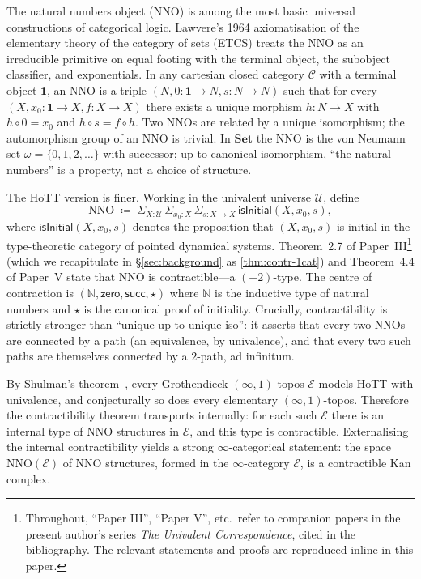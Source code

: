 \documentclass[12pt]{article}
\theoremstyle{definition}
\theoremstyle{remark}
\newcommand{\N}{\mathbb{N}}
\newcommand{\Set}{\mathbf{Set}}
\newcommand{\zero}{\mathsf{zero}}
\newcommand{\suc}{\mathsf{succ}}
\newcommand{\NNO}{\mathrm{NNO}}
\newcommand{\U}{\mathcal{U}}
\newcommand{\Sigmatype}{\Sigma}
\begin{document}
The natural numbers object (NNO) is among the most basic universal constructions of categorical logic. Lawvere's 1964 axiomatisation of the elementary theory of the category of sets (ETCS) treats the NNO as an irreducible primitive on equal footing with the terminal object, the subobject classifier, and exponentials. In any cartesian closed category $\mathcal{C}$ with a terminal object $\mathbf{1}$, an NNO is a triple $(N, 0\colon \mathbf{1}\to N, s\colon N\to N)$ such that for every $(X, x_{0}\colon \mathbf{1}\to X, f\colon X\to X)$ there exists a unique morphism $h\colon N\to X$ with $h\circ 0 = x_{0}$ and $h\circ s = f\circ h$. Two NNOs are related by a unique isomorphism; the automorphism group of an NNO is trivial. In $\Set$ the NNO is the von Neumann set $\omega = \{0,1,2,\ldots\}$ with successor; up to canonical isomorphism, ``the natural numbers'' is a property, not a choice of structure.

The HoTT version is finer. Working in the univalent universe $\U$, define
\[
\NNO \;\coloneqq\; \Sigmatype_{X:\U}\,\Sigmatype_{x_{0}:X}\,\Sigmatype_{s:X\to X}\,\mathsf{isInitial}(X,x_{0},s),
\]
where $\mathsf{isInitial}(X,x_{0},s)$ denotes the proposition that $(X,x_{0},s)$ is initial in the type-theoretic category of pointed dynamical systems. Theorem~2.7 of Paper~III\footnote{Throughout, ``Paper III'', ``Paper V'', etc.\ refer to companion papers in the present author's series \emph{The Univalent Correspondence}, cited in the bibliography. The relevant statements and proofs are reproduced inline in this paper.} (which we recapitulate in \S\ref{sec:background} as \cref{thm:contr-1cat}) and Theorem~4.4 of Paper~V state that $\NNO$ is contractible---a $(-2)$-type. The centre of contraction is $(\N,\zero,\suc,\star)$ where $\N$ is the inductive type of natural numbers and $\star$ is the canonical proof of initiality. Crucially, contractibility is strictly stronger than ``unique up to unique iso'': it asserts that every two NNOs are connected by a path (an equivalence, by univalence), and that every two such paths are themselves connected by a $2$-path, ad infinitum.

By Shulman's theorem~\cite{Shulman2019}, every Grothendieck $(\infty,1)$-topos $\mathcal{E}$ models HoTT with univalence, and conjecturally so does every elementary $(\infty,1)$-topos. Therefore the contractibility theorem transports internally: for each such $\mathcal{E}$ there is an internal type of NNO structures in $\mathcal{E}$, and this type is contractible. Externalising the internal contractibility yields a strong $\infty$-categorical statement: the space $\mathrm{NNO}(\mathcal{E})$ of NNO structures, formed in the $\infty$-category $\mathcal{E}$, is a contractible Kan complex.
\end{document}
